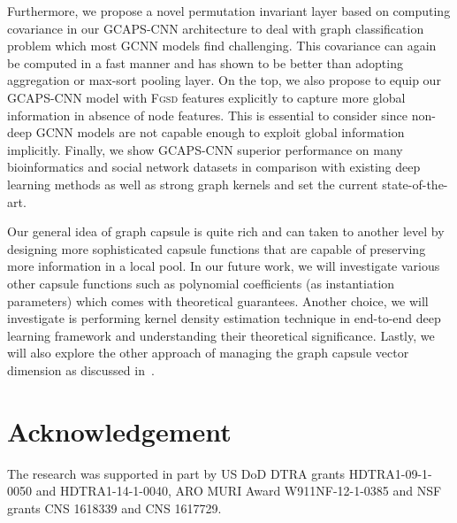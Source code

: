 \documentclass{article}
\begin{document}
Furthermore, we propose a novel permutation invariant layer based on computing covariance in our GCAPS-CNN architecture to deal with graph classification problem which most GCNN models find  challenging. This covariance can again be computed in a fast manner and has   shown to be better than adopting aggregation or max-sort pooling layer. On the top, we also propose to equip our GCAPS-CNN model with  \textsc{Fgsd} features explicitly  to capture more global information in absence of node features. This is essential   to consider since non-deep GCNN models are not capable enough to exploit global information implicitly.  Finally, we show   GCAPS-CNN   superior performance on many bioinformatics and social network datasets in comparison with  existing   deep learning methods as well as strong graph kernels   and set the current state-of-the-art.

Our general idea of graph capsule is quite rich and can taken to another level by designing  more sophisticated capsule functions that are capable of preserving more information in a local pool. In our future work, we will investigate  various other capsule functions such as  polynomial coefficients (as instantiation parameters)  which comes with theoretical guarantees. Another choice, we will investigate is performing  kernel density estimation technique  in end-to-end deep learning framework  and understanding their   theoretical significance. Lastly, we will also explore the other approach of managing the graph capsule vector dimension as discussed in~\cite{sabour2017dynamic}.

\section*{Acknowledgement}
The research was supported in part by  US DoD DTRA grants HDTRA1-09-1-0050
and HDTRA1-14-1-0040, ARO MURI Award W911NF-12-1-0385 and NSF grants CNS 1618339
and CNS 1617729. 



\end{document}
